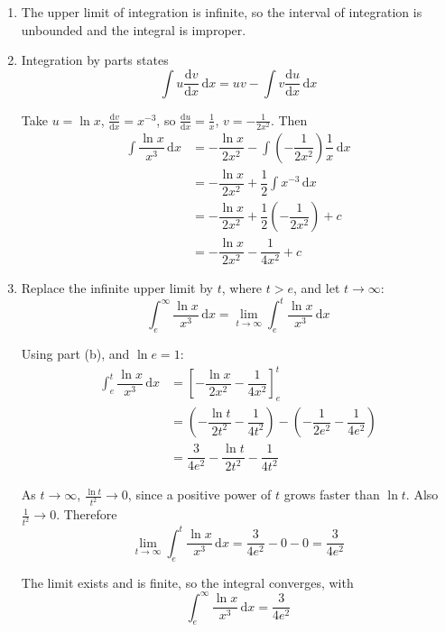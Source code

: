 \documentclass[leqno]{article}
\begin{document}
\begin{enumerate}[
  label=\textbf{\arabic*.},
  leftmargin=*,
  topsep=0pt,
  partopsep=0pt,
  parsep=0pt
]
\vspace*{10pt}

\begin{djsSolution}
\begin{enumerate}[label=\textbf{(\alph*)}, start=1]
  \item The upper limit of integration is infinite, so the interval of integration is unbounded and the integral is improper.

  \item Integration by parts states
\[
\int u\frac{\mathrm{d}v}{\mathrm{d}x}\,\mathrm{d}x = uv - \int v\frac{\mathrm{d}u}{\mathrm{d}x}\,\mathrm{d}x
\]

Take \(u=\ln x\), \(\frac{\mathrm{d}v}{\mathrm{d}x}=x^{-3}\), so \(\frac{\mathrm{d}u}{\mathrm{d}x}=\frac{1}{x}\), \(v=-\frac{1}{2x^2}\). Then
\begin{align*}
\int \dfrac{\ln x}{x^{3}}\,\mathrm{d}x &= -\dfrac{\ln x}{2x^2} - \int \left(-\dfrac{1}{2x^2}\right)\dfrac{1}{x}\,\mathrm{d}x\\
&= -\dfrac{\ln x}{2x^2} + \dfrac12\int x^{-3}\,\mathrm{d}x\\
&= -\dfrac{\ln x}{2x^2} + \dfrac12\left(-\dfrac{1}{2x^2}\right) + c\\
&= -\dfrac{\ln x}{2x^2} - \dfrac{1}{4x^2} + c
\end{align*}

  \item Replace the infinite upper limit by \(t\), where \(t>e\), and let \(t\to\infty\):
\[
\int_{e}^{\infty} \dfrac{\ln x}{x^{3}}\,\mathrm{d}x = \lim_{t\to\infty}\int_{e}^{t} \dfrac{\ln x}{x^{3}}\,\mathrm{d}x
\]

Using part (b), and \(\ln e = 1\):
\begin{align*}
\int_{e}^{t} \dfrac{\ln x}{x^{3}}\,\mathrm{d}x &= \left[-\dfrac{\ln x}{2x^2} - \dfrac{1}{4x^2}\right]_{e}^{t}\\
&= \left(-\dfrac{\ln t}{2t^2} - \dfrac{1}{4t^2}\right) - \left(-\dfrac{1}{2e^2} - \dfrac{1}{4e^2}\right)\\
&= \dfrac{3}{4e^2} - \dfrac{\ln t}{2t^2} - \dfrac{1}{4t^2}
\end{align*}

As \(t\to\infty\), \(\frac{\ln t}{t^2}\to 0\), since a positive power of \(t\) grows faster than \(\ln t\). Also \(\frac{1}{t^2}\to 0\). Therefore
\[
\lim_{t\to\infty}\int_{e}^{t} \dfrac{\ln x}{x^{3}}\,\mathrm{d}x = \dfrac{3}{4e^2} - 0 - 0 = \dfrac{3}{4e^2}
\]

The limit exists and is finite, so the integral converges, with
\[
\int_{e}^{\infty} \dfrac{\ln x}{x^{3}}\,\mathrm{d}x = \dfrac{3}{4e^2}
\]


\end{enumerate}
\end{djsSolution}
\end{enumerate}
\end{document}
